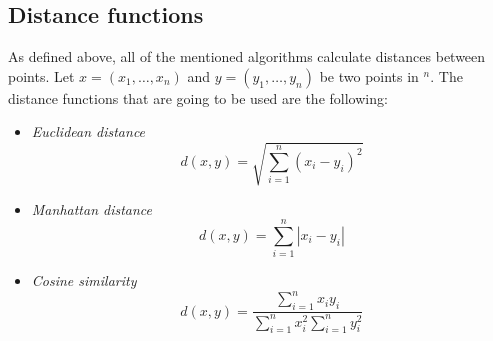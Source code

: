 \documentclass[conference]{IEEEtran}
\begin{document}
\subsection{Distance functions}
As defined above, all of the mentioned algorithms calculate distances between points. Let $x = (x_1,\dots,x_n)$ and $y = (y_1,\dots,y_n)$ be two points in $\mathbb{}^n$. The distance functions that are going to be used are the following:
\begin{itemize}
    \item \textit{Euclidean distance}
    \begin{equation*}
        d(x,y) = \sqrt{\sum_{i=1}^n (x_i-y_i)^2}
    \end{equation*}
    \item \textit{Manhattan distance}
    \begin{equation*}
       d(x,y)  = \sum_{i=1}^n |x_i-y_i|
    \end{equation*}
    \item \textit{Cosine similarity}
    \begin{equation*}
        d(x,y) = \frac{\sum_{i=1}^n x_iy_i}{\sum_{i=1}^n x_i^2\sum_{i=1}^n y_i^2}
    \end{equation*}
\end{itemize}
\end{document}
